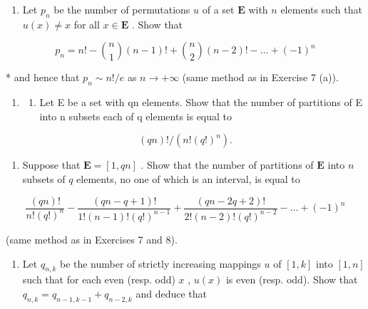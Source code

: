 \begin{enumerate}
\def\labelenumi{\arabic{enumi}.}
\setcounter{enumi}{7}
\tightlist
\item
  Let \(p_n\) be the number of permutations \(u\) of a set \(\mathbf{E}\) with \(n\) elements such that \(u(x) \neq x\) for all \(x \in \mathbf{E}\) . Show that
\end{enumerate}

\[
p _ {n} = n! - \binom {n} {1} (n - 1)! + \binom {n} {2} (n - 2)! - \dots + (- 1) ^ {n}
\]

* and hence that \(p_n \sim n! / e\) as \(n \to +\infty\) (same method as in Exercise 7 (a)).

\begin{enumerate}
\def\labelenumi{\arabic{enumi}.}
\setcounter{enumi}{8}
\tightlist
\item
  \begin{enumerate}
  \def\labelenumii{(\alph{enumii})}
  \tightlist
  \item
    Let E be a set with qn elements. Show that the number of partitions of E into n subsets each of q elements is equal to
  \end{enumerate}
\end{enumerate}

\[
(q n)! / (n! (q!) ^ {n}).
\]

\begin{enumerate}
\def\labelenumi{(\alph{enumi})}
\setcounter{enumi}{1}
\tightlist
\item
  Suppose that \(\mathbf{E} = [1, qn]\) . Show that the number of partitions of \(\mathbf{E}\) into \(n\) subsets of \(q\) elements, no one of which is an interval, is equal to
\end{enumerate}

\[
\frac {(q n) !}{n ! (q !) ^ {n}} - \frac {(q n - q + 1) !}{1 ! (n - 1) ! (q !) ^ {n - 1}} + \frac {(q n - 2 q + 2) !}{2 ! (n - 2) ! (q !) ^ {n - 2}} - \dots + (- 1) ^ {n}
\]

(same method as in Exercises 7 and 8).

\begin{enumerate}
\def\labelenumi{\arabic{enumi}.}
\setcounter{enumi}{9}
\tightlist
\item
  Let \(q_{n,k}\) be the number of strictly increasing mappings \(u\) of \([1, k]\) into \([1, n]\) such that for each even (resp. odd) \(x\) , \(u(x)\) is even (resp. odd). Show that \(q_{n,k} = q_{n-1, k-1} + q_{n-2, k}\) and deduce that
\end{enumerate}

